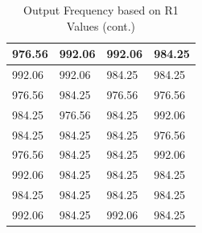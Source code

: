 \begin{table}[]
\begin{tabular}{|llll|}
			\multicolumn{1}{|l|}{976.56} & \multicolumn{1}{l|}{992.06} & \multicolumn{1}{l|}{992.06} & 984.25 \\ \hline
			\multicolumn{1}{|l|}{992.06} & \multicolumn{1}{l|}{992.06} & \multicolumn{1}{l|}{984.25} & 984.25 \\ \hline
			\multicolumn{1}{|l|}{976.56} & \multicolumn{1}{l|}{984.25} & \multicolumn{1}{l|}{976.56} & 976.56 \\ \hline
			\multicolumn{1}{|l|}{984.25} & \multicolumn{1}{l|}{976.56} & \multicolumn{1}{l|}{984.25} & 992.06 \\ \hline
			\multicolumn{1}{|l|}{984.25} & \multicolumn{1}{l|}{984.25} & \multicolumn{1}{l|}{984.25} & 976.56 \\ \hline
			\multicolumn{1}{|l|}{976.56} & \multicolumn{1}{l|}{984.25} & \multicolumn{1}{l|}{984.25} & 992.06 \\ \hline
			\multicolumn{1}{|l|}{992.06} & \multicolumn{1}{l|}{984.25} & \multicolumn{1}{l|}{984.25} & 984.25 \\ \hline
			\multicolumn{1}{|l|}{984.25} & \multicolumn{1}{l|}{984.25} & \multicolumn{1}{l|}{984.25} & 984.25 \\ \hline
			\multicolumn{1}{|l|}{992.06} & \multicolumn{1}{l|}{984.25} & \multicolumn{1}{l|}{992.06} & 984.25 \\ \hline
		\end{tabular}
	\caption{Output Frequency based on R1 Values (cont.)}
	\label{calibrationtable3}
	\end{table}